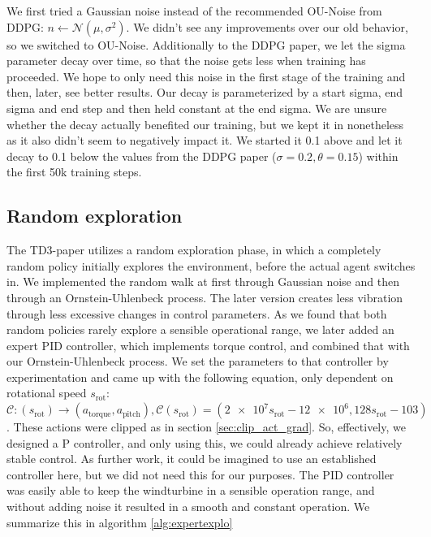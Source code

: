 \documentclass[hyperref,final,beleg]{cgvpub}
\begin{document}
We first tried a Gaussian noise instead of the recommended \ac{OU-Noise} \cite{uhlenbeckTheoryBrownianMotion1930} from \ac{DDPG}: \(n \leftarrow \mathcal{N}(\mu, \sigma^2) \). We didn't see any improvements over our old behavior, so we switched to \ac{OU-Noise}. Additionally to the \ac{DDPG} paper, we let the sigma parameter decay over time, so that the noise gets less when training has proceeded. We hope to only need this noise in the first stage of the training and then, later, see better results. Our decay is parameterized by a start sigma, end sigma and end step and then held constant at the end sigma. We are unsure whether the decay actually benefited our training, but we kept it in nonetheless as it also didn't seem to negatively impact it. We started it 0.1 above and let it decay to 0.1 below the values from the \ac{DDPG} paper ($\sigma=0.2, \theta=0.15$) within the first 50k training steps.

\subsection{Random exploration}

The TD3-paper \cite{fujimotoAddressingFunctionApproximation2018} utilizes a random exploration phase, in which a completely random policy \cite{mozerDiscoveringStructureReactive1990} initially explores the environment, before the actual agent switches in. We implemented the random walk at first through Gaussian noise and then through an Ornstein-Uhlenbeck process. The later version creates less vibration through less excessive changes in control parameters. As we found that both random policies rarely explore a sensible operational range, we later added an expert PID controller, which implements torque control, and combined that with our Ornstein-Uhlenbeck process. We set the parameters to that controller by experimentation and came up with the following equation, only dependent on rotational speed $s_{\mathrm{rot}}$: $\mathcal{C}:(s_{\mathrm{rot}})\rightarrow(a_{\mathrm{torque}}, a_{\mathrm{pitch}}), \mathcal{C}(s_{\mathrm{rot}}) = (\num{2e7} s_{\mathrm{rot}}-\num{12e6}, 128s_{\mathrm{rot}}-103)$. These actions were clipped as in section \ref{sec:clip_act_grad}. So, effectively, we designed a P controller, and only using this, we could already achieve relatively stable control. As further work, it could be imagined to use an established controller here, but we did not need this for our purposes. The PID controller was easily able to keep the windturbine in a sensible operation range, and without adding noise it resulted in a smooth and constant operation. We summarize this in algorithm \ref{alg:expertexplo}
\end{document}
